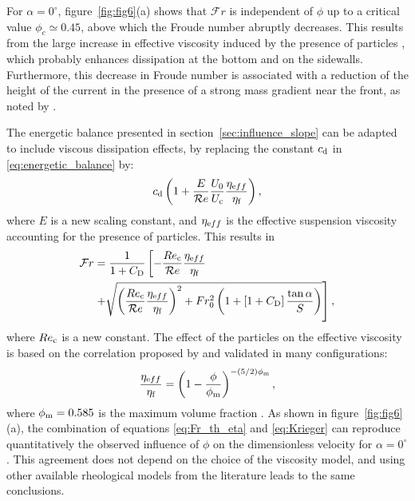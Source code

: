 \documentclass[12pt]{article}
\begin{document}
For $\alpha=0^\circ$, figure~\ref{fig:fig6}(a) shows that $\mathcal{F}r$ is independent of $\phi$ up to a critical value $\phi_{c} \simeq 0.45$, above which the Froude number abruptly decreases. This results from the large increase in effective viscosity induced by the presence of particles \citep{stickel2005fluid}, which probably enhances dissipation at the bottom and on the sidewalls. Furthermore, this decrease in Froude number is associated with a reduction of the height of the current in the presence of a strong mass gradient near the front, as noted by \citet{Schneider2023}.


The energetic balance presented in section~\ref{sec:influence_slope} can be adapted to include viscous dissipation effects, by replacing the constant $c_{\text d}$ in \eqref{eq:energetic_balance} by:
\begin{equation}
	c_{\text d}\left(1 + \frac{E}{\mathcal{R}e}\frac{U_0}{U_{\text c}}\frac{\eta_{\text eff}}{\eta_{\text f}} \right),
\end{equation}
where $E$ is a new scaling constant, and $\eta_{\text eff}$ is the effective suspension viscosity accounting for the presence of particles. This results in
\begin{equation}
	\label{eq:Fr_th_eta}
	\begin{split}
		\mathcal{F}r & =  \frac{1}{1 + C_{\text D}} \left[-\frac{Re_{\text c}}{\mathcal{R}e}\frac{\eta_{\text eff}}{\eta_{\text f}} \right. \\
		&\left. +\sqrt{\left(\frac{Re_{\text c}}{\mathcal{R}e}\frac{\eta_{\text eff}}{\eta_{\text f}} \right)^{2} + Fr_0^{2} \left(1 + \left[1 + C_{\text D}\right]\frac{\tan\alpha}{S} \right)}  \right],
	\end{split}
\end{equation}
where $Re_{\text c}$ is a new constant. The effect of the particles on the effective viscosity is based on the correlation proposed by \citet{krieger1959mechanism} and validated in many configurations:
\begin{equation}
	\label{eq:Krieger}
	\frac{\eta_{\text eff}}{\eta_{\text f}} = \left(1 - \frac{\phi}{\phi_{\text m}}\right)^{-(5/2)\phi_{\text m}},
\end{equation}
where $\phi_{\text m} = 0.585$ is the maximum volume fraction \citep{boyer2011unifying}.
%
As shown in figure~\ref{fig:fig6}(a), the combination of equations \eqref{eq:Fr_th_eta} and \eqref{eq:Krieger} can reproduce quantitatively the observed influence of $\phi$ on the dimensionless velocity for $\alpha=0^\circ$. This agreement does not depend on the choice of the viscosity model, and using other available rheological models from the literature \citep{stickel2005fluid, boyer2011unifying} leads to the same conclusions.
\end{document}
